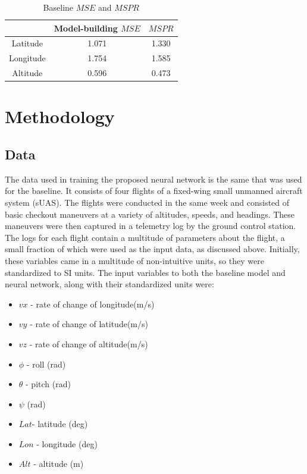 \documentclass[10pt]{IEEEtran}
\begin{document}
\begin{table}
    \caption{Baseline $MSE$ and $MSPR$}
    \centering
    \begin{tabular}{ccc}
        \hline
        &\textbf{Model-building $MSE$}&$MSPR$\\
        \hline
        Latitude&1.071&1.330\\
        Longitude&1.754&1.585\\
        Altitude&0.596&0.473\\
        \hline
    \end{tabular}
    \label{t:baseline_mse}
\end{table}

\section{Methodology}
\subsection{Data}
The data used in training the proposed neural network is the same that was used for the baseline. It consists of four flights of a fixed-wing small unmanned aircraft system (sUAS). The flights were conducted in the same week and consisted of basic checkout maneuvers at a variety of altitudes, speeds, and headings. These maneuvers were then captured in a telemetry log by the ground control station. The logs for each flight contain a multitude of parameters about the flight, a small fraction of which were used as the input data, as discussed above. Initially, these variables came in a multitude of non-intuitive units, so they were standardized to SI units. The input variables to both the baseline model and neural network, along with their standardized units were:

\begin{itemize}
    \item $vx$ - rate of change of longitude(m/s)
    \item $vy$ - rate of change of latitude(m/s)
    \item $vz$ - rate of change of altitude(m/s)
    \item $\phi$  - roll (rad)
    \item $\theta$  - pitch (rad)
    \item $\psi$ (rad)
    \item $Lat$- latitude (deg)
    \item $Lon$ - longitude (deg)
    \item $Alt$ - altitude (m)
\end{itemize}
\end{document}
